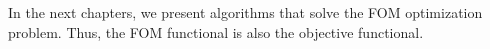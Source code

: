 In the next chapters, we present algorithms that solve the FOM optimization problem. Thus, the FOM functional is also the objective functional.
































































